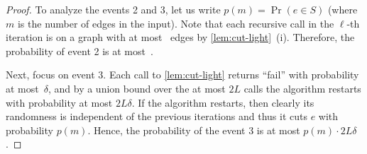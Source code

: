 \begin{proof}
To analyze the events 2 and 3, let us write $p(m) = \Pr(e \in S)$ (where $m$ is the number of edges in the input). Note that each recursive call in the $\ell$-th iteration is on a graph with at most~ edges by \cref{lem:cut-light}~(i). Therefore, the probability of event 2 is at most~.

Next, focus on event 3. Each call to \cref{lem:cut-light} returns ``fail'' with probability at most~$\delta$, and by a union bound over the at most $2L$ calls the algorithm restarts with probability at most $2L\delta$. If the algorithm restarts, then clearly its randomness is independent of the previous iterations and thus it cuts $e$ with probability $p(m)$. Hence, the probability of the event 3 is at most $p(m) \cdot 2L\delta$.


\end{proof}
